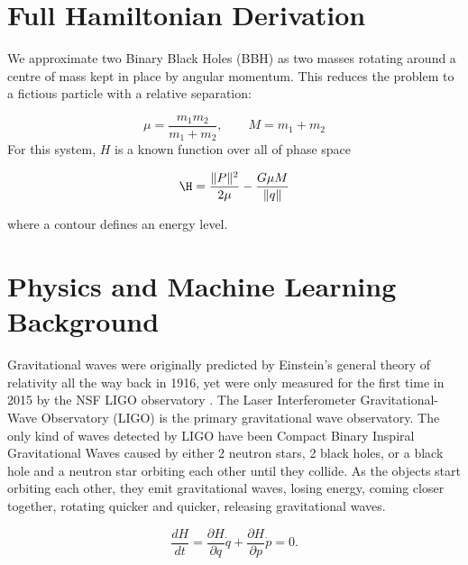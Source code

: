 \documentclass[conference]{IEEEtran}
\begin{document}

\section{Full Hamiltonian Derivation}

We approximate two Binary Black Holes (BBH) as two masses rotating around a centre of mass kept in place by angular momentum. This reduces the problem to a fictious particle with a relative separation:

\begin{equation}
\mu = \frac{m_1 m_2}{m_1 + m_2}, \qquad M = m_1 + m_2
\end{equation}
For this system, $H$ is a known function over all of phase space

\begin{equation}
\H = \frac{\|P\|^2}{2 \mu} - \frac{G \mu M}{\|q\|}
\end{equation}

where a contour defines an energy level. 

\section{Physics and Machine Learning Background}

Gravitational waves were originally predicted by Einstein's general theory of relativity all the way back in 1916, yet were only measured for the first time in 2015 by the NSF LIGO observatory \cite{LIGOLabGW}. The Laser Interferometer Gravitational-Wave Observatory (LIGO) is the primary gravitational wave observatory. The only kind of waves detected by LIGO have been Compact Binary Inspiral Gravitational Waves caused by either 2 neutron stars, 2 black holes, or a black hole and a neutron star orbiting each other until they collide\cite{LIGOLabSources}. As the objects start orbiting each other, they emit gravitational waves, losing energy, coming closer together, rotating quicker and quicker, releasing gravitational waves. 

\begin{equation}
\frac{dH}{dt} =
\frac{\partial H}{\partial q}\dot{q}
+ \frac{\partial H}{\partial p}\dot{p}
= 0.
\end{equation}
\end{document}
